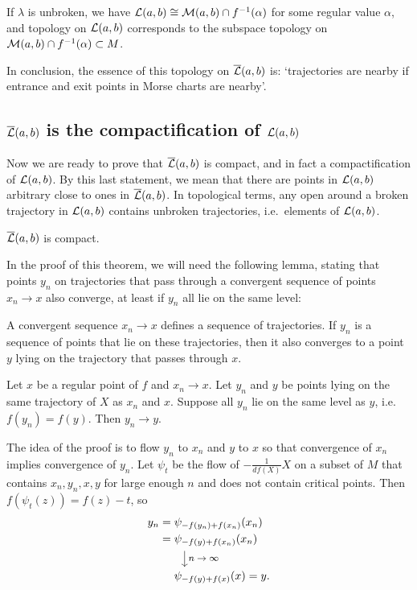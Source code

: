\begin{remark}
    If $\lambda$ is unbroken, we have $\mathcal L(a, b) \cong \mathcal M(a, b) \cap  f^{-1}(\alpha)$ for some regular value $\alpha$, and topology on $\mathcal L(a, b)$ corresponds to the subspace topology on $\mathcal M(a, b) \cap  f^{-1}(\alpha) \subset M$.
\end{remark}

In conclusion, the essence of this topology on $\overline{\mathcal L}(a, b)$ is: `trajectories are nearby if entrance and exit points in Morse charts are nearby'.

\subsection{$\overline{\mathcal L}(a, b)$ is the compactification of $\mathcal L(a, b)$}
Now we are ready to prove that $\overline{\mathcal L}(a, b)$ is compact, and in fact a compactification of  $\mathcal L(a, b)$. By this last statement, we mean that there are points in $\mathcal L(a, b)$ arbitrary close to ones in  $\overline{\mathcal L}(a, b)$.
In topological terms, any open around a broken trajectory in $\mathcal L(a, b)$ contains unbroken trajectories, i.e.\ elements of $\mathcal L(a, b)$.
\begin{theorem}
    $\overline{\mathcal L}(a, b)$ is compact.
\end{theorem}

In the proof of this theorem, we will need the following lemma, stating that points $y_n$ on trajectories that pass through a convergent sequence of points $x_n \to x$ also converge, at least if $y_n$ all lie on the same level:
\begin{marginfigure}
    \centering
    \caption{A convergent sequence $x_n \to  x$ defines a sequence of trajectories. If $y_n$ is a sequence of points that lie on these trajectories, then it also converges to a point $y$ lying on the trajectory that passes through $x$.}
    \label{fig:lemma-partial-squared-zero-proof}
\end{marginfigure}
\begin{lemma}
    Let $x$ be a regular point of $f$ and $x_n \to x$.
    Let $y_n$ and  $y$ be points lying on the same trajectory of $X$ as  $x_n$ and  $x$.
    Suppose all $y_n$ lie on the same level as  $y$, i.e.  $f(y_n) = f(y)$.
    Then  $y_n \to  y$.
    \label{lemma:level-sets}
\end{lemma}
\begin{myproof}
    The idea of the proof is to flow $y_n$ to  $x_n$ and $y$ to $x$ so that convergence of $x_n$ implies convergence of $y_n$.
    Let  $\psi_t$ be the flow of  $-\frac{1}{df (X)} X$ on a subset of $M$ that contains $x_n, y_n, x, y$ for large enough  $n$ and does not contain critical points.
    Then $f(\psi_t(z)) = f(z) - t$, so
     \begin{align*}
         y_n &= \psi_{-f(y_n) + f(x_n)}(x_n)\\
         &= \psi_{-f(y) + f(x_n)}(x_n)\\
         & \qquad \tikz \draw[->]  (0,0) -- (0,-0.5) node[midway, right]{\footnotesize$n \to  \infty$};\\[-0.4em]
         &\mbox{}\phantom{{}={}}\psi_{-f(y) + f(x)}(x) = y
    .\end{align*} 
\end{myproof}

